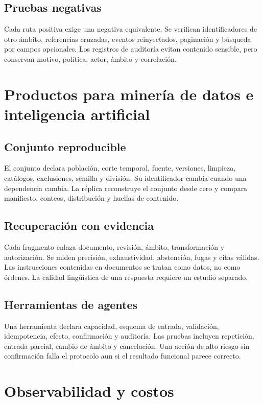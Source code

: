 \section{Pruebas negativas}

Cada ruta positiva exige una negativa equivalente. Se verifican identificadores de otro
ámbito, referencias cruzadas, eventos reinyectados, paginación y búsqueda por campos
opcionales. Los registros de auditoría evitan contenido sensible, pero conservan motivo,
política, actor, ámbito y correlación.

\chapter{Productos para minería de datos e inteligencia artificial}

\section{Conjunto reproducible}

El conjunto declara población, corte temporal, fuente, versiones, limpieza, catálogos,
exclusiones, semilla y división. Su identificador cambia cuando una dependencia cambia.
La réplica reconstruye el conjunto desde cero y compara manifiesto, conteos, distribución
y huellas de contenido.

\section{Recuperación con evidencia}

Cada fragmento enlaza documento, revisión, ámbito, transformación y autorización. Se
miden precisión, exhaustividad, abstención, fugas y citas válidas. Las instrucciones
contenidas en documentos se tratan como datos, no como órdenes. La calidad lingüística
de una respuesta requiere un estudio separado.

\section{Herramientas de agentes}

Una herramienta declara capacidad, esquema de entrada, validación, idempotencia, efecto,
confirmación y auditoría. Las pruebas incluyen repetición, entrada parcial, cambio de
ámbito y cancelación. Una acción de alto riesgo sin confirmación falla el protocolo aun
si el resultado funcional parece correcto.

\chapter{Observabilidad y costos}

